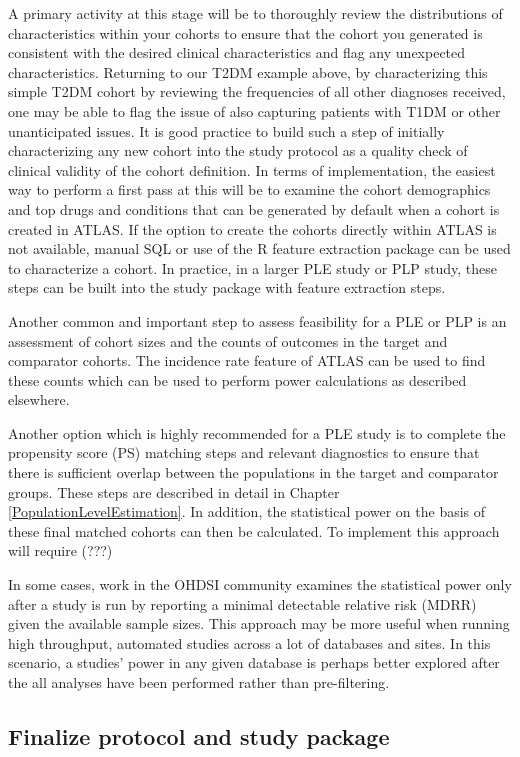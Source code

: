 \documentclass[11pt]{book}
\theoremstyle{definition}
\theoremstyle{definition}
\theoremstyle{definition}
\theoremstyle{remark}
\begin{document}
A primary activity at this stage will be to thoroughly review the distributions of characteristics within your cohorts to ensure that the cohort you generated is consistent with the desired clinical characteristics and flag any unexpected characteristics. Returning to our T2DM example above, by characterizing this simple T2DM cohort by reviewing the frequencies of all other diagnoses received, one may be able to flag the issue of also capturing patients with T1DM or other unanticipated issues. It is good practice to build such a step of initially characterizing any new cohort into the study protocol as a quality check of clinical validity of the cohort definition. In terms of implementation, the easiest way to perform a first pass at this will be to examine the cohort demographics and top drugs and conditions that can be generated by default when a cohort is created in ATLAS. If the option to create the cohorts directly within ATLAS is not available, manual SQL or use of the R feature extraction package can be used to characterize a cohort. In practice, in a larger PLE study or PLP study, these steps can be built into the study package with feature extraction steps.

Another common and important step to assess feasibility for a PLE or PLP is an assessment of cohort sizes and the counts of outcomes in the target and comparator cohorts. The incidence rate feature of ATLAS can be used to find these counts which can be used to perform power calculations as described elsewhere.

Another option which is highly recommended for a PLE study is to complete the propensity score (PS) matching steps and relevant diagnostics to ensure that there is sufficient overlap between the populations in the target and comparator groups. These steps are described in detail in Chapter \ref{PopulationLevelEstimation}. In addition, the statistical power on the basis of these final matched cohorts can then be calculated. To implement this approach will require (???)

In some cases, work in the OHDSI community examines the statistical power only after a study is run by reporting a minimal detectable relative risk (MDRR) given the available sample sizes. This approach may be more useful when running high throughput, automated studies across a lot of databases and sites. In this scenario, a studies' power in any given database is perhaps better explored after the all analyses have been performed rather than pre-filtering.

\hypertarget{finalize-protocol-and-study-package}{%
\subsection{Finalize protocol and study package}\label{finalize-protocol-and-study-package}}
\end{document}
